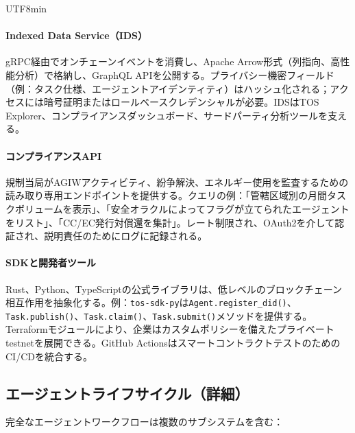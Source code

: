 \documentclass[11pt]{article}
\begin{document}
\begin{CJK}{UTF8}{min}
\paragraph{Indexed Data Service（IDS）} gRPC経由でオンチェーンイベントを消費し、Apache Arrow形式（列指向、高性能分析）で格納し、GraphQL APIを公開する。プライバシー機密フィールド（例：タスク仕様、エージェントアイデンティティ）はハッシュ化される；アクセスには暗号証明またはロールベースクレデンシャルが必要。IDSはTOS Explorer、コンプライアンスダッシュボード、サードパーティ分析ツールを支える。

\paragraph{コンプライアンスAPI} 規制当局がAGIWアクティビティ、紛争解決、エネルギー使用を監査するための読み取り専用エンドポイントを提供する。クエリの例：「管轄区域別の月間タスクボリュームを表示」、「安全オラクルによってフラグが立てられたエージェントをリスト」、「CC/EC発行対償還を集計」。レート制限され、OAuth2を介して認証され、説明責任のためにログに記録される。

\paragraph{SDKと開発者ツール} Rust、Python、TypeScriptの公式ライブラリは、低レベルのブロックチェーン相互作用を抽象化する。例：\texttt{tos-sdk-py}は\texttt{Agent.register\_did()}、\texttt{Task.publish()}、\texttt{Task.claim()}、\texttt{Task.submit()}メソッドを提供する。Terraformモジュールにより、企業はカスタムポリシーを備えたプライベートtestnetを展開できる。GitHub Actionsはスマートコントラクトテストのための CI/CDを統合する。

\subsection{エージェントライフサイクル（詳細）}
完全なエージェントワークフローは複数のサブシステムを含む：


\end{CJK}
\end{document}

